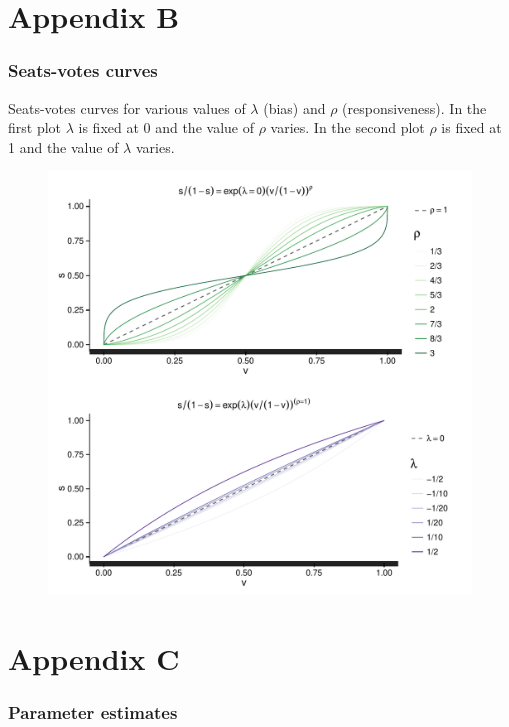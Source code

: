 \chapter*{Appendix B}\label{AppendixB}
\vspace{-1.75cm}

\subsection*{Seats-votes curves}

Seats-votes curves for various values of $\lambda$ (bias) and $\rho$ (responsiveness). 
In the first plot $\lambda$ is fixed at 0 and the value of $\rho$ varies. In the second plot 
$\rho$ is fixed at 1 and the value of $\lambda$ varies. 

\begin{figure}[h]
\centering
	\includegraphics[scale=0.8]{sections/figs/seats_votes}
\label{fig:seats_votes}
\end{figure}


\chapter*{Appendix C}\label{AppendixC}
\vspace{-1.75cm}
\subsection*{Parameter estimates}


